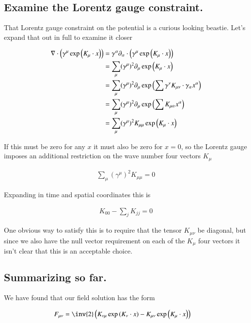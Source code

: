 \documentclass{article}
\begin{document}
\subsection{ Examine the Lorentz gauge constraint. }

That Lorentz gauge constraint on the potential is a curious looking beastie.  Let's expand that out in full to examine it closer

\begin{align*}
\nabla \cdot \left(\gamma^\mu \exp\left( K_\mu \cdot x \right)\right) 
&= \gamma^\alpha \partial_\alpha \cdot \left(\gamma^\mu \exp\left( K_\mu \cdot x \right)\right)  \\
&= \sum_\mu (\gamma^\mu)^2 \partial_\mu \exp\left( K_\mu \cdot x \right) \\
&= \sum_\mu (\gamma^\mu)^2 \partial_\mu \exp\left( \sum \gamma^\nu K_{\mu\nu} \cdot \gamma_\alpha x^\alpha \right) \\
&= \sum_\mu (\gamma^\mu)^2 \partial_\mu \exp\left( \sum K_{\mu\alpha} x^\alpha \right) \\
&= \sum_\mu (\gamma^\mu)^2 K_{\mu\mu} \exp\left( K_\mu \cdot x \right)
\end{align*}

If this must be zero for any $x$ it must also be zero for $x =0$, so the Lorentz gauge imposes an additional restriction on the
wave number four vectors $K_\mu$

\begin{align*}
\sum_\mu (\gamma^\mu)^2 K_{\mu\mu} = 0 
\end{align*}

Expanding in time and spatial coordinates this is

\begin{align*}
K_{00} - \sum_j K_{jj} = 0 
\end{align*}

One obvious way to satisfy this is to require that the tensor $K_{\mu\nu}$ be diagonal, but since we also have the null vector requirement
on each of the $K_\mu$ four vectors it isn't clear that this is an acceptable choice.

\subsection{ Summarizing so far. }

We have found that our field solution has the form

\begin{align}\label{eqn:WorkingSolution}
F_{\mu\nu} &= \inv{2} \left( K_{\nu\mu} \exp\left( K_{\nu} \cdot x \right) - K_{\mu\nu} \exp\left( K_{\mu} \cdot x \right) \right)
\end{align}
\end{document}
